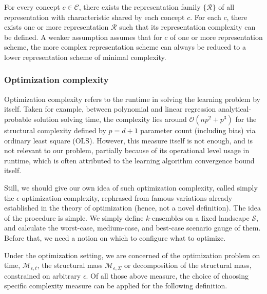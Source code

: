 \documentclass[10pt]{article} %
\begin{document}
\begin{assumption}
    For every concept $c\in\mathcal{C}$, there exists the representation family $\{\mathcal{R}\}$ of all representation with characteristic shared by each concept $c$. For each $c$, there exists one or more representation $\mathcal{R}$ such that its representation complexity can be defined. A weaker assumption assumes that for $c$ of one or more representation scheme, the more complex representation scheme can always be reduced to a lower representation scheme of minimal complexity.
\end{assumption}

\subsubsection{Optimization complexity}

Optimization complexity refers to the runtime in solving the learning problem by itself. Taken for example, between polynomial and linear regression analytical-probable solution solving time, the complexity lies around $\mathcal{O}(np^{2}+p^{3})$ for the structural complexity defined by $p=d+1$ parameter count (including bias) via ordinary least square (OLS). However, this measure itself is not enough, and is not relevant to our problem, partially because of its operational level usage in runtime, which is often attributed to the learning algorithm convergence bound itself. 

Still, we should give our own idea of such optimization complexity, called simply the $\epsilon$-optimization complexity, rephrased from famous variations already established in the theory of optimization (hence, not a novel definition). The idea of the procedure is simple. We simply define $k$-ensembles on a fixed landscape $\mathcal{S}$, and calculate the worst-case, medium-case, and best-case scenario gauge of them. Before that, we need a notion on which to configure what to optimize. 

Under the optimization setting, we are concerned of the optimization problem on time, $\mathcal{M}_{\epsilon,t}$, the structural mass $\mathcal{M}_{\epsilon,\Sigma}$ or decomposition of the structural mass, constrained on arbitrary $\epsilon$. Of all those above measure, the choice of choosing specific complexity measure can be applied for the following definition. 
\end{document}
